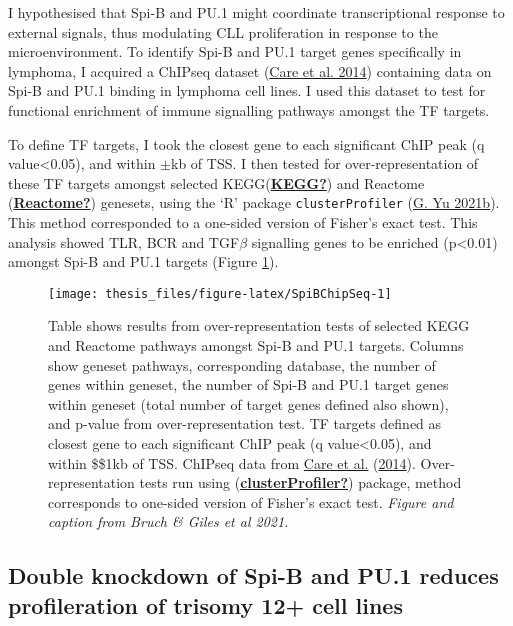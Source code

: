 \documentclass[11pt, a4paper, twosided]{book}
\begin{document}
I hypothesised that Spi-B and PU.1 might coordinate transcriptional response to external signals, thus modulating CLL proliferation in response to the microenvironment. To identify Spi-B and PU.1 target genes specifically in lymphoma, I acquired a ChIPseq dataset (\protect\hyperlink{ref-Care2014}{Care et al. 2014}) containing data on Spi-B and PU.1 binding in lymphoma cell lines. I used this dataset to test for functional enrichment of immune signalling pathways amongst the TF targets.

To define TF targets, I took the closest gene to each significant ChIP peak (q value\textless0.05), and within \(\pm\)kb of TSS. I then tested for over-representation of these TF targets amongst selected KEGG(\protect\hyperlink{ref-KEGG}{\textbf{KEGG?}}) and Reactome (\protect\hyperlink{ref-Reactome}{\textbf{Reactome?}}) genesets, using the `R' package \texttt{clusterProfiler} (\protect\hyperlink{ref-R-clusterProfiler}{G. Yu 2021b}). This method corresponded to a one-sided version of Fisher's exact test. This analysis showed TLR, BCR and TGF\(\beta\) signalling genes to be enriched (p\textless0.01) amongst Spi-B and PU.1 targets (Figure \ref{fig:SpiBChipSeq}).


\begin{figure}

{\centering \texttt{[image: thesis\_files/figure-latex/SpiBChipSeq-1]} 

}

\caption{Table shows results from over-representation tests of selected KEGG and Reactome pathways amongst Spi-B and PU.1 targets. Columns show geneset pathways, corresponding database, the number of genes within geneset, the number of Spi-B and PU.1 target genes within geneset (total number of target genes defined also shown), and p-value from over-representation test. TF targets defined as closest gene to each significant ChIP peak (q value\textless0.05), and within \$\pm\$1kb of TSS. ChIPseq data from \protect\hyperlink{ref-Care2014}{Care et al.} (\protect\hyperlink{ref-Care2014}{2014}). Over-representation tests run using (\protect\hyperlink{ref-clusterProfiler}{\textbf{clusterProfiler?}}) package, method corresponds to one-sided version of Fisher's exact test. \emph{Figure and caption from Bruch \& Giles et al 2021.}}\label{fig:SpiBChipSeq}
\end{figure}
\hypertarget{double-knockdown-of-spi-b-and-pu.1-reduces-profileration-of-trisomy-12-cell-lines}{%
\subsection{Double knockdown of Spi-B and PU.1 reduces profileration of trisomy 12+ cell lines}\label{double-knockdown-of-spi-b-and-pu.1-reduces-profileration-of-trisomy-12-cell-lines}}
\end{document}
